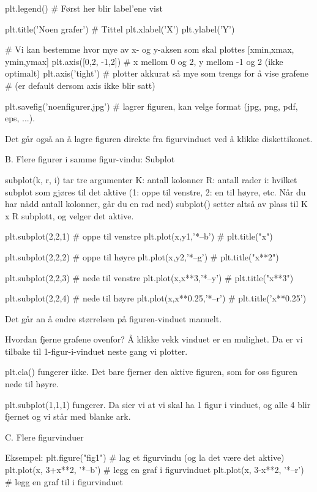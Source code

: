 \documentclass[a4paper,11pt,utf8]{book}
\begin{document}
plt.legend()    # Først her blir label'ene vist 

plt.title('Noen grafer')  # Tittel
plt.xlabel('X') 
plt.ylabel('Y')

# Vi kan bestemme hvor mye av x- og y-aksen som skal plottes [xmin,xmax, ymin,ymax]
plt.axis([0,2, -1,2])     # x mellom 0 og 2, y mellom -1 og 2  (ikke optimalt)
plt.axis('tight')         # plotter akkurat så mye som trengs for å vise grafene 
                          # (er default dersom axis ikke blir satt)
 
plt.savefig('noenfigurer.jpg')  # lagrer figuren, kan velge format (jpg, png, pdf, eps, ...). 

Det går også an å lagre figuren direkte fra figurvinduet ved å klikke diskettikonet. 




B. Flere figurer i samme figur-vindu: Subplot 

subplot(k, r, i) tar tre argumenter 
 K: antall kolonner 
 R: antall rader
 i: hvilket subplot som gjøres til det aktive 
    (1: oppe til venstre, 2: en til høyre, etc. Når du har nådd antall kolonner, går du en rad ned)
subplot() setter altså av plass til K x R subplott, og velger det aktive. 

plt.subplot(2,2,1)          # oppe til venstre 
plt.plot(x,y1,'*--b')       # 
plt.title("x")

plt.subplot(2,2,2)          # oppe til høyre
plt.plot(x,y2,'*--g')       # 
plt.title("x**2")

plt.subplot(2,2,3)          # nede til venstre
plt.plot(x,x**3,'*--y')     # 
plt.title("x**3")

plt.subplot(2,2,4)          # nede til høyre
plt.plot(x,x**0.25,'*--r')  # 
plt.title('x**0.25')


Det går an å endre størrelsen på figuren-vinduet manuelt. 


Hvordan fjerne grafene ovenfor? 
Å klikke vekk vinduet er en mulighet. Da er vi tilbake til 1-figur-i-vinduet neste gang vi plotter. 

plt.cla()  fungerer ikke. Det bare fjerner den aktive figuren, som for oss figuren nede til høyre. 

plt.subplot(1,1,1) fungerer. Da sier vi at vi skal ha 1 figur i vinduet, og alle 4 blir fjernet 
og vi står med blanke ark. 




C. Flere figurvinduer 

Eksempel: 
plt.figure("fig1")                     # lag et figurvindu (og la det være det aktive)
plt.plot(x, 3+x**2, '*--b')          # legg en graf i figurvinduet
plt.plot(x, 3-x**2, '*--r')          # legg en graf til i figurvinduet
\end{document}
